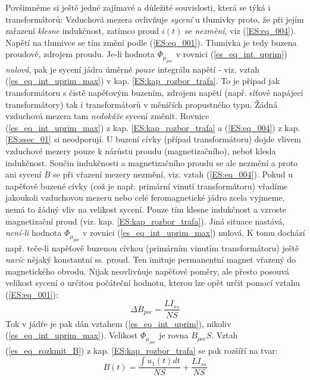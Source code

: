       Povšimněme si ještě jedné zajímavé a důležité souvislosti, která se týká i transformátorů:
      Vzduchová mezera ovlivňuje \emph{sycení} u tlumivky proto, že při jejím zařazení 
      \emph{klesne} indukčnost, zatímco proud \(i(t)\) se \emph{nezmění}, viz (\ref{ES:eq_004}). 
      Napětí na tlumivce se tím změní podle (\ref{ES:eq_001}). Tlumivka je tedy buzena
      proudově, zdrojem proudu. Je-li hodnota \(\Phi_{\mu_{poc}}\) v rovnici 
      (\ref{es_eq_int_uprim}) \emph{nulová}, pak je sycení jádra úměrné \emph{pouze} integrálu 
      napětí - viz. vztah (\ref{es_eq_int_uprim_max}) v kap. \ref{ES:kap_rozbor_trafa}. To je 
      případ jak transformátoru s čistě napěťovým buzením, zdrojem napětí (např. síťové napájecí 
      transformátory) tak i transformátorů v měničích propustného typu. Žádná vzduchová mezera tam 
      \emph{nedokáže} sycení změnit. Rovnice (\ref{es_eq_int_uprim_max}) z kap. 
      \ref{ES:kap_rozbor_trafa} a (\ref{ES:eq_004}) z kap. \ref{ES:ssec_01} si neodporují. U 
       buzení cívky (případ transformátoru) dojde vlivem vzduchové mezery pouze k 
      nárůstu proudu (magnetizačního), neboť klesla indukčnost. Součin indukčnosti a magnetizačního 
      proudu se ale nezmění a proto ani sycení \(B\) se při vřazení mezery nezmění, viz. vztah 
      (\ref{ES:eq_004}). Pokud u napěťově buzené cívky (což je např. primární vinutí
      transformátoru) vřadíme jakoukoli vzduchovou mezeru nebo celé feromagnetické jádro zcela
      vyjmeme, nemá to žádný vliv na velikost sycení. Pouze tím klesne indukčnost a vzroste 
      magnetizační proud (viz. kap. \ref{ES:kap_rozbor_trafa}). Jiná situace nastává, 
      \emph{není-li} hodnota \(\Phi_{\mu_{poc}}\) v rovnici (\ref{es_eq_int_uprim_max}) nulová. K 
      tomu dochází např. teče-li napěťově buzenou cívkou (primárním vinutím transformátoru) ještě 
      \emph{navíc} nějaký konstantní ss. proud. Ten imituje permanentní magnet vřazený do 
      magnetického obvodu. Nijak neovlivňuje napěťové poměry, ale přesto posouvá velikost sycení o 
      určitou počáteční hodnotu, kterou lze opět určit pomocí vztahu (\ref{ES:eq_001}):
      \begin{equation}\label{ES:eq_013}
         \Delta B_{poc} = \frac{LI_{ss}}{NS}
      \end{equation}
      Tok v jádře je pak dán vztahem (\ref{es_eq_int_uprim}), nikoliv (\ref{es_eq_int_uprim_max}). 
      Velikost \(\Phi_{\mu_{poc}}\) je rovna \(B_{poc}S\). Vztah (\ref{es_eq_rozkmit_B}) z kap. 
      \ref{ES:kap_rozbor_trafa} se pak rozšíří na tvar:
      \begin{equation}\label{ES_eq_014}
        B(t)=\frac{\int u_1(t)dt}{NS} + \frac{LI_{ss}}{NS}
      \end{equation}
      
